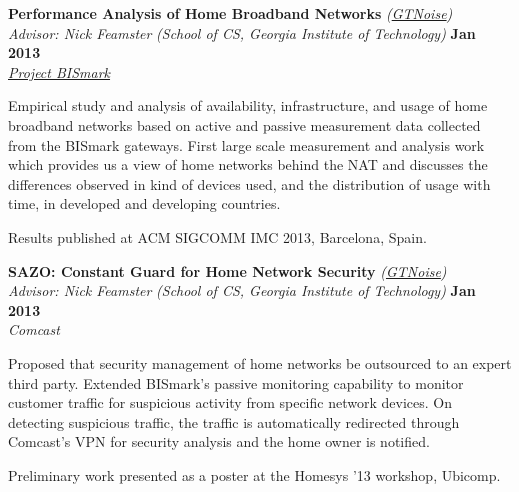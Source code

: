 \documentclass[margin,line]{resume}
\begin{document}
\begin{resume}
    \textbf{Performance Analysis of Home Broadband Networks}
    \emph{(\href{http://gtnoise.net/}{GTNoise})} \\
    \hspace{-1pt}\emph{Advisor: {Nick Feamster}}
    \emph{(School of CS, Georgia Institute of Technology)}			\hfill \textbf{Jan 2013} \\
    \hspace{-1pt}\emph{\href{http://projectbismark.net/}{Project BISmark}} 		\\\vspace{-4mm}
    \begin{list2}
    \item Empirical study and analysis of availability, infrastructure, and usage of home broadband networks based on active and passive measurement data collected from the BISmark gateways. First large scale measurement and analysis work which provides us a view of home networks behind the NAT and discusses the differences observed in kind of devices used, and the distribution of usage with time, in developed and developing countries.
    \item Results published at ACM SIGCOMM IMC 2013, Barcelona, Spain.
    \end{list2}
\vspace{-2mm}

    \textbf{SAZO: Constant Guard for Home Network Security}
    \emph{(\href{http://gtnoise.net/}{GTNoise})} \\
    \hspace{-1pt}\emph{Advisor: {Nick Feamster}}
    \emph{(School of CS, Georgia Institute of Technology)}			\hfill \textbf{Jan 2013} \\
    \hspace{-1pt}\emph{Comcast} 		\\\vspace{-4mm}
    \begin{list2}
    \item Proposed that security management of home networks be outsourced to an expert third party. Extended BISmark's passive monitoring capability to monitor customer traffic for suspicious activity from specific network devices. On detecting suspicious traffic, the traffic is automatically redirected through Comcast's VPN for security analysis and the home owner is notified.
    \item Preliminary work presented as a poster at the Homesys '13 workshop, Ubicomp.
    \end{list2}
\vspace{-2mm}


\end{resume}
\end{document}
